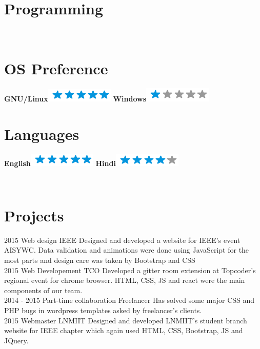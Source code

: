 \documentclass[]{friggeri-cv}
\begin{document}
\begin{aside}
  \section{Programming}
    ~
  \section{OS Preference}
    \textbf{GNU/Linux}\includegraphics[scale=0.40]{img/5stars.png}
    \textbf{Windows}\includegraphics[scale=0.40]{img/1stars.png}
    ~
  \section{Languages}
    \textbf{English}\includegraphics[scale=0.40]{img/5stars.png}
    \textbf{Hindi}\includegraphics[scale=0.40]{img/4stars.png}
    ~
\end{aside}
~
\section{ Projects}
\begin{entrylist}
  \entry
    {2015}
    {Web design}
    {IEEE}
    {Designed and developed a website for IEEE's event AISYWC. Data validation and animations were done using JavaScript for the most parts and design care was taken by Bootstrap and CSS \\}
  \entry
    {2015}
    {Web Developement}
    {TCO}
    {Developed a gitter room extension at Topcoder's regional event for chrome browser. HTML, CSS, JS and react were the main components of our team. \\}
    \entry
    {2014 - 2015}
    {Part-time collaboration}
    {Freelancer}
    {Has solved some major CSS and PHP bugs in wordpress templates asked by freelancer's clients. \\}
    \entry
    {2015}
    {Webmaster}
    {LNMIIT}
    {Designed and developed LNMIIT's student branch website for IEEE chapter which again used HTML, CSS, Bootstrap, JS and JQuery.}
\end{entrylist}
\\
\end{document}
